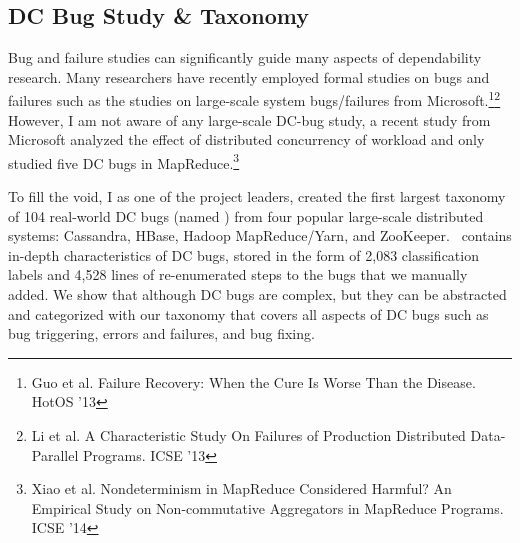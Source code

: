 \documentclass[10pt]{article}
\begin{document}
\subsection{DC Bug Study \& Taxonomy} 

Bug and failure studies can significantly guide many aspects of dependability
research. Many researchers have recently employed formal studies on bugs and
failures such as the studies on large-scale system bugs/failures from
Microsoft.\footnote{Guo et al. Failure
Recovery: When the Cure Is Worse Than the Disease. HotOS '13}\footnote{Li et al.
A Characteristic Study On Failures of Production Distributed Data-Parallel
Programs. ICSE '13}
%
However, I am not aware of any large-scale DC-bug study, a recent study from
Microsoft analyzed the effect of distributed concurrency of workload and only
studied five DC bugs in MapReduce.\footnote{Xiao et al.
Nondeterminism in MapReduce Considered Harmful? An Empirical Study on
Non-commutative Aggregators in MapReduce Programs. ICSE '14}

To fill the void, I as one of the project leaders, created the first largest
taxonomy of 104 real-world DC bugs (named \taxdc)
\cite{Leesatapornwongsa+16-TaxDC} from four popular large-scale distributed
systems: Cassandra, HBase, Hadoop MapReduce/Yarn, and ZooKeeper.  \taxdc\
contains in-depth characteristics of DC bugs, stored in the form of 2,083
classification labels and 4,528 lines of re-enumerated steps to the bugs that
we manually added. We show that although DC bugs are complex, but they can be
abstracted and categorized with our taxonomy that covers all aspects of DC bugs
such as bug triggering, errors and failures, and bug fixing.


%

\end{document}

